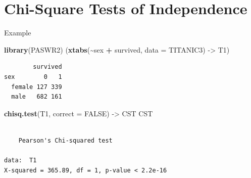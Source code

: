 \documentclass[
  ignorenonframetext,
]{beamer}
\newenvironment{Shaded}{\begin{snugshade}}{\end{snugshade}}
\newcommand{\AttributeTok}[1]{\textcolor[rgb]{0.13,0.29,0.53}{#1}}
\newcommand{\ConstantTok}[1]{\textcolor[rgb]{0.56,0.35,0.01}{#1}}
\newcommand{\FunctionTok}[1]{\textcolor[rgb]{0.13,0.29,0.53}{\textbf{#1}}}
\newcommand{\NormalTok}[1]{#1}
\newcommand{\OtherTok}[1]{\textcolor[rgb]{0.56,0.35,0.01}{#1}}
\newcommand{\SpecialCharTok}[1]{\textcolor[rgb]{0.81,0.36,0.00}{\textbf{#1}}}
\begin{document}
\hypertarget{chi-square-tests-of-independence}{%
\section{Chi-Square Tests of
Independence}\label{chi-square-tests-of-independence}}

\begin{frame}[fragile]{Example}
\protect\hypertarget{example}{}
\begin{Shaded}
\begin{Highlighting}[]
\FunctionTok{library}\NormalTok{(PASWR2)}
\NormalTok{(}\FunctionTok{xtabs}\NormalTok{(}\SpecialCharTok{\textasciitilde{}}\NormalTok{sex }\SpecialCharTok{+}\NormalTok{ survived, }\AttributeTok{data =}\NormalTok{ TITANIC3) }\OtherTok{{-}\textgreater{}}\NormalTok{ T1)}
\end{Highlighting}
\end{Shaded}

\begin{verbatim}
        survived
sex        0   1
  female 127 339
  male   682 161
\end{verbatim}

\begin{Shaded}
\begin{Highlighting}[]
\FunctionTok{chisq.test}\NormalTok{(T1, }\AttributeTok{correct =} \ConstantTok{FALSE}\NormalTok{) }\OtherTok{{-}\textgreater{}}\NormalTok{ CST}
\NormalTok{CST}
\end{Highlighting}
\end{Shaded}

\begin{verbatim}

    Pearson's Chi-squared test

data:  T1
X-squared = 365.89, df = 1, p-value < 2.2e-16
\end{verbatim}
\end{frame}
\end{document}
